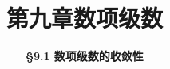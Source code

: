 \everymath{\displaystyle}



\title[第九章\\
数项级数]{\texorpdfstring{\LARGE \bfseries 第九章\quad 数项级数}{第九章 数项级数}} %
\author[\smaller \S 9.1\\
数项级数的收敛性] %
{\Large \bfseries \S 9.1 数项级数的收敛性}
\date{}





\begin{frame}

\titlepage %

\end{frame}



